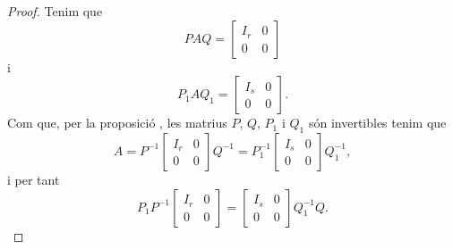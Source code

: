 \documentclass[../Apunts.tex]{subfiles}
\begin{document}
\begin{theorem}
\begin{proof}
			Tenim que
			\[PAQ=\left[\begin{array}{c|c}
			I_{r} & 0\\\hline
			0 & 0
			\end{array}\right]\]
			i
			\[P_{1}AQ_{1}=\left[\begin{array}{c|c}
			I_{s} & 0\\\hline
			0 & 0
			\end{array}\right].\]
			Com que, per la proposició , les matrius \(P\), \(Q\), \(P_{1}\) i \(Q_{1}\) són invertibles tenim que
			\[A=P^{-1}\left[\begin{array}{c|c}
			I_{r} & 0\\\hline
			0 & 0
			\end{array}\right]Q^{-1}=P_{1}^{-1}\left[\begin{array}{c|c}
			I_{s} & 0\\\hline
			0 & 0
			\end{array}\right]Q_{1}^{-1},\]
			i per tant
			\[P_{1}P^{-1}\left[\begin{array}{c|c}
			I_{r} & 0\\\hline
			0 & 0
			\end{array}\right]=
			\left[\begin{array}{c|c}
			I_{s} & 0\\\hline
			0 & 0
			\end{array}\right]Q_{1}^{-1}Q.\]
			

\end{proof}
\end{theorem}
\end{document}
